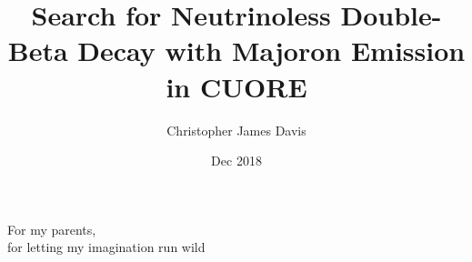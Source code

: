 \documentclass[12 pt]{mythesis}
\author{Christopher James Davis}
\title{Search for Neutrinoless Double-Beta Decay with Majoron Emission in CUORE}
\date{Dec 2018}
\begin{document}
\frontmatter

\maketitle

\makecopyright

\tableofcontents
\listoffigures
\listoftables


\mainmatter

\begin{flushright}
\null {}
For my parents, \\
for letting my imagination run wild
\null
\end{flushright}









\backmatter
\appendix



\end{document}
